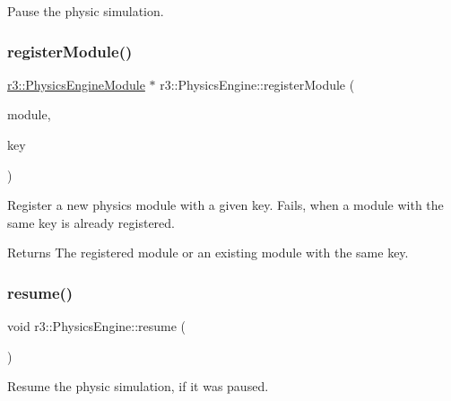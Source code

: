 Pause the physic simulation. 

\mbox{\label{classr3_1_1_physics_engine_aead3d2707fa52fc65701a55b811b571e}} 
\subsubsection{\texorpdfstring{register\+Module()}{registerModule()}}
{\footnotesize\ttfamily \mbox{\hyperlink{classr3_1_1_physics_engine_module}{r3\+::\+Physics\+Engine\+Module}} $\ast$ r3\+::\+Physics\+Engine\+::register\+Module (\begin{DoxyParamCaption}\item[{\mbox{\hyperlink{classr3_1_1_physics_engine_module}{Physics\+Engine\+Module}} $\ast$}]{module,  }\item[{const std\+::string \&}]{key }\end{DoxyParamCaption})}



Register a new physics module with a given key. Fails, when a module with the same key is already registered. 

\begin{DoxyReturn}{Returns}
The registered module or an existing module with the same key. 
\end{DoxyReturn}
\mbox{\label{classr3_1_1_physics_engine_a149087534c28ba2d5118a2b6d652491c}} 
\subsubsection{\texorpdfstring{resume()}{resume()}}
{\footnotesize\ttfamily void r3\+::\+Physics\+Engine\+::resume (\begin{DoxyParamCaption}{ }\end{DoxyParamCaption})}



Resume the physic simulation, if it was paused. 

\mbox{\label{classr3_1_1_physics_engine_aba6b8345f61da6e9e1baa6c745eb1803}} 
